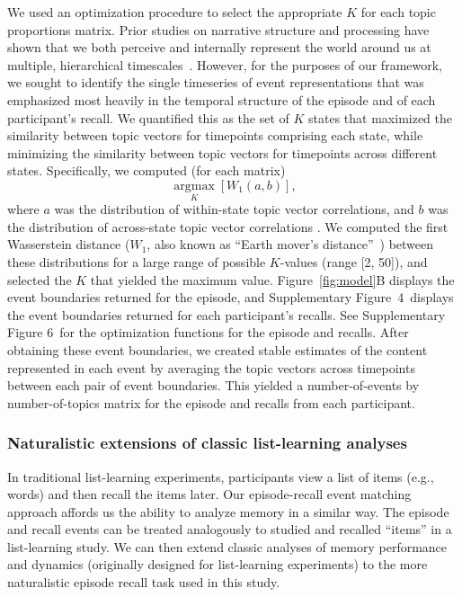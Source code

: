\documentclass[10pt]{article}
\newcommand{\argmax}{\mathop{\mathrm{argmax}}\limits}
\newcommand{\corrmats}{4}
\newcommand{\kopt}{6}
\begin{document}
We used an optimization procedure to select the appropriate $K$ for each topic proportions matrix.  Prior studies on narrative structure and processing have shown that we both perceive and internally represent the world around us at multiple, hierarchical timescales~\citep{HassEtal08, LernEtal11, HassEtal15, ChenEtal17, BaldEtal17, BaldEtal18}.  However, for the purposes of our framework, we sought to identify the single timeseries of event representations that was emphasized most heavily in the temporal structure of the episode and of each participant's recall.  We quantified this as the set of $K$ states that maximized the similarity between topic vectors for timepoints comprising each state, while minimizing the similarity between topic vectors for timepoints across different states.  Specifically, we computed (for each matrix)
\[
  \argmax_K \left[W_{1}(a, b)\right],
\]
where $a$ was the distribution of within-state topic vector correlations, and $b$ was the distribution of across-state topic vector correlations .  We computed the first Wasserstein distance ($W_{1}$, also known as ``Earth mover's distance''~\citep{Dobr70, RamdEtal17}) between these distributions for a large range of possible $K$-values (range [2, 50]), and selected the $K$ that yielded the maximum value.  Figure~\ref{fig:model}B displays the event boundaries returned for the episode, and Supplementary Figure~\corrmats~displays the event boundaries returned for each participant's recalls.  See Supplementary Figure \kopt~for the optimization functions for the episode and recalls.  After obtaining these event boundaries, we created stable estimates of the content represented in each event by averaging the topic vectors across timepoints between each pair of event boundaries.  This yielded a number-of-events by number-of-topics matrix for the episode and recalls from each participant.

\subsubsection*{Naturalistic extensions of classic list-learning analyses}
In traditional list-learning experiments, participants view a list of items (e.g., words) and then recall the items later.  Our episode-recall event matching approach affords us the ability to analyze memory in a similar way. The episode and recall events can be treated analogously to studied and recalled ``items'' in a list-learning study.  We can then extend classic analyses of memory performance and dynamics (originally designed for list-learning experiments) to the more naturalistic episode recall task used in this study.
\end{document}
